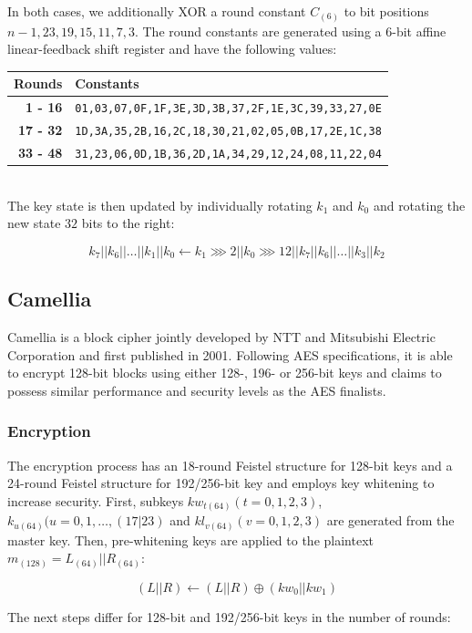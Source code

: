 In both cases, we additionally XOR a round constant $C_{(6)}$ to bit positions
$n-1,23,19,15,11,7,3$. The round constants are generated using a 6-bit affine
linear-feedback shift register and have the following values:\\

\begin{tabular}{r|l}
    \textbf{Rounds} & \textbf{Constants} \\
    \hline
    \textbf{1 - 16} &  \small\texttt{01,03,07,0F,1F,3E,3D,3B,37,2F,1E,3C,39,33,27,0E} \\
    \textbf{17 - 32} & \small\texttt{1D,3A,35,2B,16,2C,18,30,21,02,05,0B,17,2E,1C,38} \\
    \textbf{33 - 48} & \small\texttt{31,23,06,0D,1B,36,2D,1A,34,29,12,24,08,11,22,04}
\end{tabular}\\

The key state is then updated by individually rotating $k_1$ and $k_0$ and
rotating the new state $32$ bits to the right:

\[
    k_7||k_6||\dots||k_1||k_0\leftarrow k_1\ggg 2||k_0\ggg 12||k_7||k_6||\dots||k_3||k_2
\]

\subsection{Camellia}

Camellia \cite{camellia:2001} is a block cipher jointly developed by NTT and
Mitsubishi Electric Corporation and first published in 2001. Following AES
specifications, it is able to encrypt 128-bit blocks using either 128-, 196- or
256-bit keys and claims to possess similar performance and security levels as
the AES finalists.

\subsubsection{Encryption}

The encryption process has an 18-round Feistel structure for 128-bit keys and a
24-round Feistel structure for 192/256-bit key and employs key whitening to
increase security. First, subkeys $kw_{t(64)}(t=0,1,2,3)$,
$k_{u(64)}(u=0,1,\dots,(17|23)$ and $kl_{v(64)}(v=0,1,2,3)$ are generated from
the master key. Then, pre-whitening keys are applied to the plaintext
$m_{(128)}=L_{(64)}||R_{(64)}$:

\[
    (L||R)\leftarrow (L||R)\oplus (kw_0||kw_1)
\]

The next steps differ for 128-bit and 192/256-bit keys in the number of rounds:

